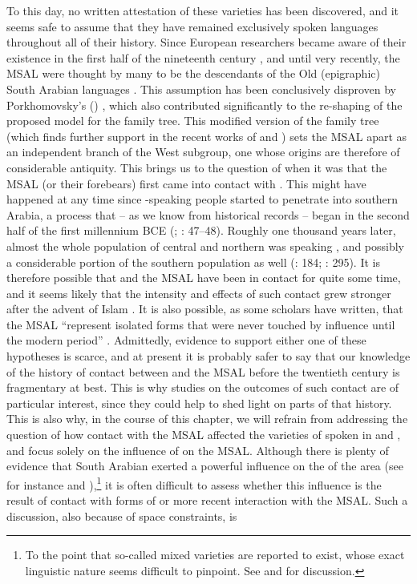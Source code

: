 \documentclass[output=paper]{langsci/langscibook}
\begin{document}
To this day, no written attestation of these varieties has been discovered, and it seems safe to assume that they have remained exclusively spoken languages throughout all of their history. Since European researchers became aware of their existence in the first half of the nineteenth century \citep{Wellsted1837}, and until very recently, the MSAL were thought by many to be the descendants of the Old (epigraphic) South Arabian languages \citep[16]{Rubin2014}. This assumption has been conclusively disproven by Porkhomovsky’s (\citeyear{Porkhomovsky1997}) , which also contributed significantly to the re-shaping of the proposed model for the  family tree. This modified version of the family tree (which finds further support in the recent works of \citealt{Kogan2015} and \citealt{Edzard2017}) sets the MSAL apart as an independent branch of the West  subgroup, one whose origins are therefore of considerable antiquity. This brings us to the question of when it was that the MSAL (or their forebears) first came into contact with . This might have happened at any time since -speaking people started to penetrate into southern Arabia, a process that – as we know from historical records – began in the second half of the first millennium BCE (\citealt{Robin1991}; \citealt{Hoyland2001}: 47--48). Roughly one thousand years later, almost the whole population of central and northern  was speaking , and possibly a considerable portion of the southern population as well (\citealt{Beeston1981}: 184; \citealt{Zammit2011}: 295). It is therefore possible that  and the MSAL have been in contact for quite some time, and it seems likely that the intensity and effects of such contact grew stronger after the advent of Islam \citep[247]{Lonnet2011}. It is also possible, as some scholars have written, that the MSAL “represent isolated forms that were never touched by  influence until the modern period” \citep[127]{Versteegh2014book}. Admittedly, evidence to support either one of these hypotheses is scarce, and at present it is probably safer to say that our knowledge of the history of contact between  and the MSAL before the twentieth century is fragmentary at best. This is why studies on the outcomes of such contact are of particular interest, since they could help to shed light on parts of that history. This is also why, in the course of this chapter, we will refrain from addressing the question of how contact with the MSAL affected the varieties of  spoken in  and , and focus solely on the influence of  on the MSAL. Although there is plenty of evidence that South Arabian exerted a powerful influence on the  of the area (see for instance \citealt{Retsö2000} and \citealt{Watson2018}),\footnote{To the point that so-called mixed varieties are reported to exist, whose exact linguistic nature seems difficult to pinpoint. See \citet{WatsonEtAl2006} and \citet{Watson2011SAYemeni} for discussion.} it is often difficult to assess whether this influence is the result of contact with forms of  or more recent interaction with the MSAL. Such a discussion, also because of space constraints, is 
\end{document}
